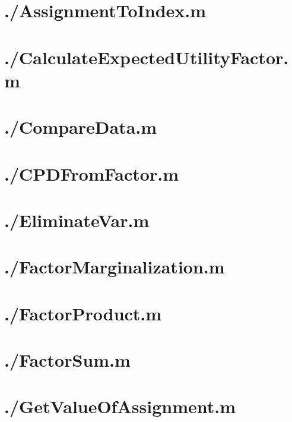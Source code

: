 \documentclass{article}
\begin{document}
\tableofcontents
\newpage
\section{./AssignmentToIndex.m}

\section{./CalculateExpectedUtilityFactor.m}

\section{./CompareData.m}

\section{./CPDFromFactor.m}

\section{./EliminateVar.m}

\section{./FactorMarginalization.m}

\section{./FactorProduct.m}

\section{./FactorSum.m}

\section{./GetValueOfAssignment.m}

\end{document}
